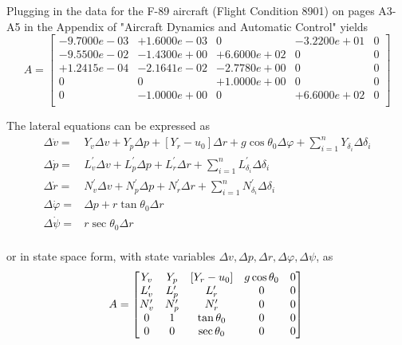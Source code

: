 \documentclass[12pt]{article}
\begin{document}
\noindent Plugging in the data for the F-89 aircraft (Flight Condition 8901) on pages A3-A5 in the Appendix of "Aircraft Dynamics and Automatic Control" yields
\begin{equation*}
A =
\begin{bmatrix}
  -9.7000e-03  & +1.6000e-03  &           0  & -3.2200e+01 &           0 \\
  -9.5500e-02  & -1.4300e+00  & +6.6000e+02  &           0 &           0 \\
  +1.2415e-04  & -2.1641e-02  & -2.7780e+00  &           0 &           0 \\
            0  &           0  & +1.0000e+00  &           0 &           0 \\
            0  & -1.0000e+00  &           0  & +6.6000e+02 &           0 \\
\end{bmatrix}
\end{equation*}

\noindent The lateral equations can be expressed as
\begin{equation}
\begin{split}
\Delta \dot{v} = & Y_v\Delta v + Y_p\Delta p + \left[ Y_r - u_0 \right]\Delta r + g\cos\theta_0\Delta \varphi + \sum\limits_{i=1}^n Y_{\delta_i} \Delta \delta_i \\
\Delta \dot{p} = & L_v^\prime \Delta v + L_p^\prime \Delta p + L_r^\prime \Delta r + \sum\limits_{i=1}^n L_{\delta_i}^\prime \Delta \delta_i \\
\Delta \dot{r} = & N_v^\prime \Delta v + N_p^\prime \Delta p + N_r^\prime \Delta r + \sum\limits_{i=1}^n N_{\delta_i}^\prime \Delta \delta_i \\
\Delta \dot{\varphi} = &\Delta p + r\tan\theta_0\Delta r\\
\Delta \dot{\psi} = &r\sec\theta_0\Delta r\\
\end{split}
\label{lat}
\end{equation}

\noindent or in state space form, with state variables $\Delta v, \Delta p, \Delta r, \Delta \varphi, \Delta \psi $, as
\begin{equation*}
A =
\begin{bmatrix}
    Y_v & Y_p & \left[ Y_r-u_0 \right] & g\cos \theta_0 & 0 \\
    L_v^\prime & L_p^\prime & L_r^\prime & 0 & 0 \\
    N_v^\prime & N_p^\prime & N_r^\prime & 0 & 0 \\
    0 & 1 & \tan \theta_0 & 0 & 0 \\
    0 & 0 & \sec \theta_0 & 0 & 0
\end{bmatrix}\\
\end{equation*}
\end{document}
